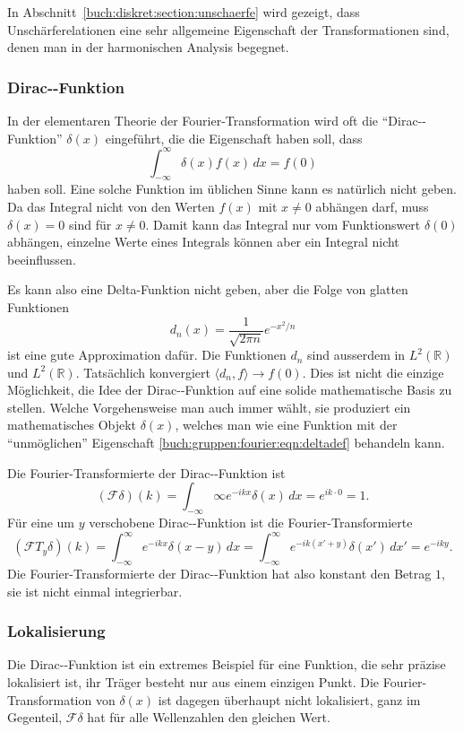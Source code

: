 In Abschnitt~\ref{buch:diskret:section:unschaerfe} wird gezeigt, dass
Unschärferelationen eine sehr allgemeine Eigenschaft der Transformationen
sind, denen man in der harmonischen Analysis begegnet.

%
%
\subsubsection{Dirac-\textdelta-Funktion}
In der elementaren Theorie der Fourier-Transformation wird oft 
die ``Dirac-\textdelta-Funktion'' $\delta(x)$ eingeführt, die die
Eigenschaft haben soll, dass
\begin{equation}
\int_{-\infty}^\infty \delta(x) f(x)\,dx = f(0)
\label{buch:gruppen:fourier:eqn:deltadef}
\end{equation}
haben soll.
Eine solche Funktion im üblichen Sinne kann es natürlich nicht geben.
Da das Integral nicht von den Werten $f(x)$ mit $x\ne 0$ abhängen darf,
muss $\delta(x)=0$ sind für $x\ne 0$.
Damit kann das Integral nur vom Funktionswert $\delta(0)$ abhängen,
einzelne Werte eines Integrals können aber ein Integral nicht beeinflussen.

Es kann also eine Delta-Funktion nicht geben, aber die Folge von
glatten Funktionen
\[
d_n(x) = \frac{1}{\!\sqrt{2\pi n}} e^{-x^2/n}
\]
ist eine gute Approximation dafür.
Die Funktionen $d_n$ sind ausserdem in $L^2(\mathbb{R})$ und
$L^2(\mathbb{R})$.
Tatsächlich konvergiert $\langle d_n,f\rangle \to f(0)$.
Dies ist nicht die einzige Möglichkeit, die Idee der 
Dirac-\textdelta-Funktion auf eine solide mathematische Basis zu
stellen.
Welche Vorgehensweise man auch immer wählt, sie produziert ein
mathematisches Objekt $\delta(x)$, welches man wie eine Funktion
mit der ``unmöglichen'' Eigenschaft
\eqref{buch:gruppen:fourier:eqn:deltadef}
behandeln kann.

Die Fourier-Transformierte der Dirac-\textdelta-Funktion ist
\[
(\mathscr{F}\delta)(k)
=
\int_{-\infty}\infty e^{-ikx}\delta(x)\,dx
=
e^{ik\cdot 0}
=
1.
\]
Für eine um $y$ verschobene Dirac-\textdelta-Funktion ist die
Fourier-Transformierte
\[
(\mathscr{F}T_y\delta)(k)
=
\int_{-\infty}^\infty e^{-ikx}\delta(x-y)\,dx
=
\int_{-\infty}^\infty e^{-ik(x'+y)}\delta(x')\,dx'
=
e^{-iky}.
\]
Die Fourier-Transformierte der Dirac-\textdelta-Funktion hat also 
konstant den Betrag $1$, sie ist nicht einmal integrierbar.

%
%
\subsubsection{Lokalisierung}
Die Dirac-\textdelta-Funktion ist ein extremes Beispiel für eine
Funktion, die sehr präzise lokalisiert ist, ihr Träger besteht nur
aus einem einzigen Punkt.
Die Fourier-Transformation von $\delta(x)$ ist dagegen überhaupt
nicht lokalisiert, ganz im Gegenteil, $\mathscr{F}\delta$ hat für alle
Wellenzahlen den gleichen Wert.

